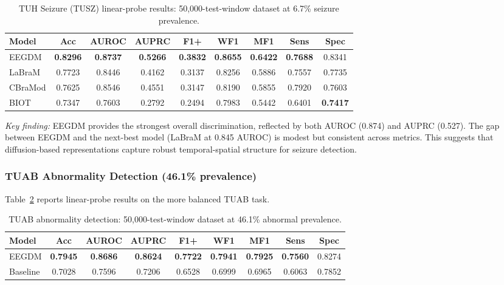 \documentclass[journal]{IEEEtran}
\newcommand{\best}[1]{\textbf{#1}}
\begin{document}
\begin{table}[t]
\centering
\caption{TUH Seizure (TUSZ) linear-probe results: 50,000-test-window dataset at 6.7\% seizure prevalence.}
\label{tab:tusz_results}
\small
\setlength{\tabcolsep}{2.5pt}
\begin{tabular}{@{}lcccccccc@{}}
\toprule
Model & Acc & AUROC & AUPRC & F1+ & WF1 & MF1 & Sens & Spec \\
\midrule
EEGDM & \best{0.8296} & \best{0.8737} & \best{0.5266} & \best{0.3832} & \best{0.8655} & \best{0.6422} & \best{0.7688} & 0.8341 \\
LaBraM & 0.7723 & 0.8446 & 0.4162 & 0.3137 & 0.8256 & 0.5886 & 0.7557 & 0.7735 \\
CBraMod & 0.7625 & 0.8546 & 0.4551 & 0.3147 & 0.8190 & 0.5855 & 0.7920 & 0.7603 \\
BIOT & 0.7347 & 0.7603 & 0.2792 & 0.2494 & 0.7983 & 0.5442 & 0.6401 & \best{0.7417} \\
\bottomrule
\end{tabular}
\end{table}

\textit{Key finding:} EEGDM provides the strongest overall discrimination, reflected by both AUROC (0.874) and AUPRC (0.527). The gap between EEGDM and the next-best model (LaBraM at 0.845 AUROC) is modest but consistent across metrics. This suggests that diffusion-based representations capture robust temporal-spatial structure for seizure detection.

\subsubsection{TUAB Abnormality Detection (46.1\% prevalence)}

Table~\ref{tab:tuab_results} reports linear-probe results on the more balanced TUAB task.

\begin{table}[t]
\centering
\caption{TUAB abnormality detection: 50,000-test-window dataset at 46.1\% abnormal prevalence.}
\label{tab:tuab_results}
\small
\setlength{\tabcolsep}{2.5pt}
\begin{tabular}{@{}lcccccccc@{}}
\toprule
Model & Acc & AUROC & AUPRC & F1+ & WF1 & MF1 & Sens & Spec \\
\midrule
EEGDM & \best{0.7945} & \best{0.8686} & \best{0.8624} & \best{0.7722} & \best{0.7941} & \best{0.7925} & \best{0.7560} & 0.8274 \\
Baseline & 0.7028 & 0.7596 & 0.7206 & 0.6528 & 0.6999 & 0.6965 & 0.6063 & 0.7852 \\
\bottomrule
\end{tabular}
\end{table}
\end{document}
